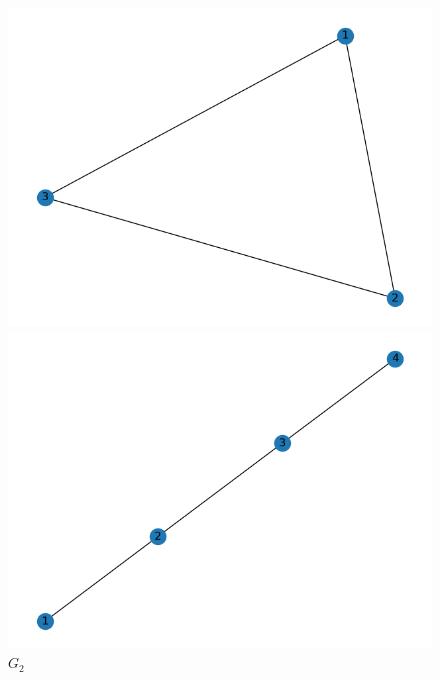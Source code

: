 \documentclass[11pt,a4paper,openright,oneside]{book}
\numberwithin{equation}{section}
\begin{document}
{\begin{figure}[H]
    \begin{minipage}[t]{0.32\linewidth}
        \centering
        \includegraphics[width=\linewidth]{media/graph-backprop-1.png}
        \caption*{$G_1$}
    \end{minipage}
    \begin{minipage}[t]{0.32\linewidth}
        \centering
        \includegraphics[width=\linewidth]{media/graph-backprop-2.png}
        \caption*{$G_2$}
    \end{minipage}
    \begin{minipage}[t]{0.32\linewidth}
        \centering

\end{minipage}
\end{figure}}
\end{document}
